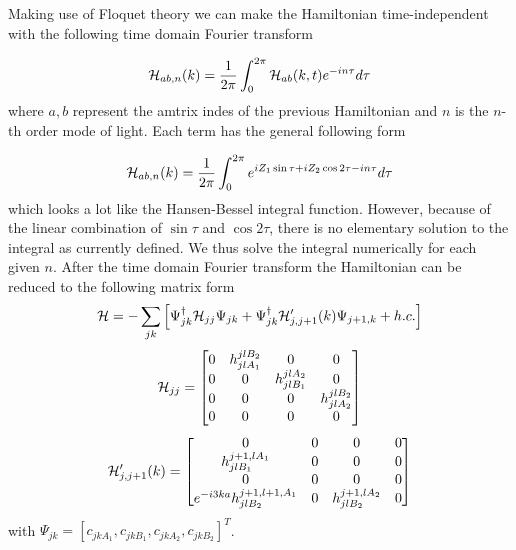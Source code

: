 Making use of Floquet theory we can make the Hamiltonian time-independent with the following time domain Fourier transform

\begin{equation}
  \mathcal{H}_{ab,n}(k) = \dfrac{1}{2\pi} \int_0^{2\pi} \mathcal{H}_{ab}(k,t) e^{-in\tau} d\tau
\end{equation}
where $a,b$ represent the amtrix indes of the previous Hamiltonian and $n$ is the $n$-th order mode of light.
Each term has the general following form

\begin{equation}
  \mathcal{H}_{ab,n}(k) = \dfrac{1}{2\pi} \int_0^{2\pi} e^{i Z_1 \sin\tau + i Z_2 \cos2\tau - in\tau} d\tau
\end{equation}
which looks a lot like the Hansen-Bessel integral function.
However, because of the linear combination of $\sin\tau$ and $\cos 2\tau$, there is no elementary solution to the integral as currently defined.
We thus solve the integral numerically for each given $n$.
After the time domain Fourier transform the Hamiltonian can be reduced to the following matrix form
\begin{equation}
  \mathcal{H} = -\sum_{jk} \left[ \Psi_{jk}^{\dagger} \mathcal{H}_{jj} \Psi_{jk} + \Psi_{jk}^{\dagger} \mathcal{H}_{j,j+1}'(k) \Psi_{j+1,k} + h.c. \right]
\end{equation}
\[
  \mathcal{H}_{jj} =
  \begin{bmatrix}
    0 & h_{jlA_1}^{jlB_2} & 0 & 0 \\
    0 & 0 & h_{jlB_1}^{jlA_2} & 0 \\
    0 & 0 & 0 & h_{jlA_2}^{jlB_2} \\
    0 & 0 & 0 & 0
  \end{bmatrix}
\]
\[
  \mathcal{H}_{j,j+1}'(k) =
  \begin{bmatrix}
    0 & 0 & 0 & 0 \\
    h_{jlB_1}^{j+1,lA_1} & 0 & 0 & 0 \\
    0 & 0 & 0 & 0 \\
    e^{-i3ka} h_{jlB_2}^{j+1,l+1,A_1} & 0 & h_{jlB_2}^{j+1,lA_2} & 0
  \end{bmatrix}
\]
with $\Psi_{jk} = [c_{jkA_1}, c_{jkB_1}, c_{jkA_2}, c_{jkB_2}]^T$.
